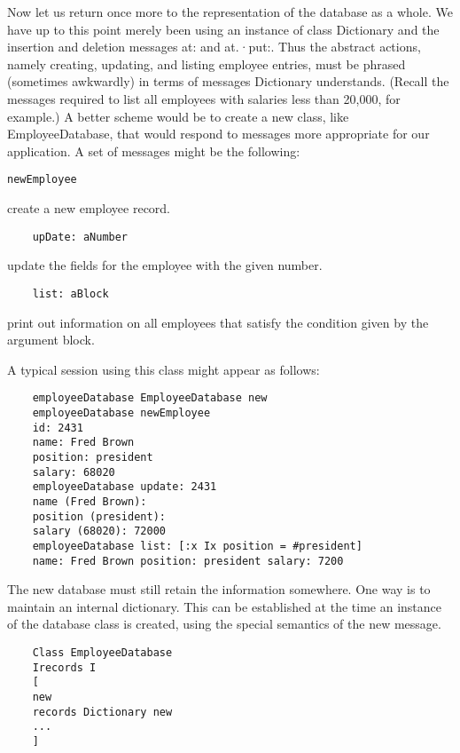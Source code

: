 Now let us return once more to the representation of the database as
a whole. We have up to this point merely been using an instance of class
Dictionary and the insertion and deletion messages at: and at.·put:. Thus
the abstract actions, namely creating, updating, and listing employee entries, must be phrased (sometimes awkwardly) in terms of messages Dictionary understands. (Recall the messages required to list all employees
with salaries less than 20,000, for example.) A better scheme would be to
create a new class, like EmployeeDatabase, that would respond to messages more appropriate for our application. A set of messages might be
the following:

\begin{lstlisting}
newEmployee
\end{lstlisting}

create a new employee record.

\begin{lstlisting}
    upDate: aNumber
\end{lstlisting}

update the fields for the employee with the given number.

\begin{lstlisting}
    list: aBlock
\end{lstlisting}

print out information on all employees that satisfy the condition given
by the argument block.

A typical session using this class might appear as follows:
\begin{lstlisting}
    employeeDatabase EmployeeDatabase new
    employeeDatabase newEmployee
    id: 2431
    name: Fred Brown
    position: president
    salary: 68020
    employeeDatabase update: 2431
    name (Fred Brown):
    position (president):
    salary (68020): 72000
    employeeDatabase list: [:x Ix position = #president]
    name: Fred Brown position: president salary: 7200
\end{lstlisting}

The new database must still retain the information somewhere. One
way is to maintain an internal dictionary. This can be established at the
time an instance of the database class is created, using the special semantics of the new message.
\begin{lstlisting}
    Class EmployeeDatabase
    Irecords I
    [
    new
    records Dictionary new
    ...
    ]
\end{lstlisting}

